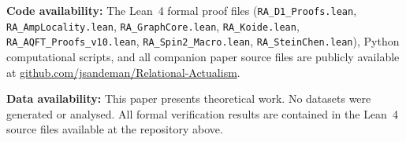 \documentclass[11pt,a4paper]{article}
\theoremstyle{plain}
\theoremstyle{definition}
\theoremstyle{remark}
\begin{document}
\textbf{Code availability:} The Lean~4 formal proof files
(\texttt{RA\_D1\_Proofs.lean}, \texttt{RA\_AmpLocality.lean},
\texttt{RA\_GraphCore.lean}, \texttt{RA\_Koide.lean},
\texttt{RA\_AQFT\_Proofs\_v10.lean}, \texttt{RA\_Spin2\_Macro.lean},
\texttt{RA\_SteinChen.lean}),
Python computational scripts, and all companion paper source files are publicly
available at \href{https://github.com/jsandeman/Relational-Actualism}{github.com/jsandeman/Relational-Actualism}.

\textbf{Data availability:} This paper presents theoretical work. No datasets
were generated or analysed. All formal verification results are contained in the
Lean~4 source files available at the repository above.


\end{document}
